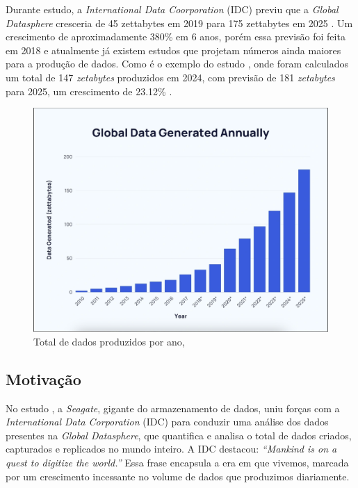 \documentclass[a4paper, 12pt]{article}
\newcommand{\citeb}[1]{\bibleftbracket\cite{#1}\bibrightbracket}
\begin{document}
    Durante estudo, a \textit{International Data Coorporation} (IDC) previu que a \textit{Global Datasphere} cresceria de 45 zettabytes em 2019 para 175 zettabytes em 2025 \citeb{digitization}. Um crescimento de aproximadamente 380\% em 6 anos, porém essa previsão foi feita em 2018 e atualmente já existem estudos que projetam números ainda maiores para a produção de dados. Como é o exemplo do estudo , onde foram calculados um total de 147 \textit{zetabytes} produzidos em 2024, com previsão de 181 \textit{zetabytes} para 2025, um crescimento de 23.12\% \citeb{data_created}.

    \begin{figure}[h]
        \includegraphics[width=\textwidth,height=0.9\textheight,keepaspectratio]{global-data-generated-annually-fabio-duarte.png}
        \centering
        \caption{Total de dados produzidos por ano, \citeb{data_created}}
        \centering
        \label{fig:total_dados_anual}
    \end{figure}        

    \subsection{Motivação}

    No estudo , a \textit{Seagate}, gigante do armazenamento de dados, uniu forças com a \textit{International Data Corporation} (IDC) para conduzir uma análise dos dados presentes na \textit{Global Datasphere}, que quantifica e analisa o total de dados criados, capturados e replicados no mundo inteiro. A IDC destacou: \textit{“Mankind is on a quest to digitize the world.”} Essa frase encapsula a era em que vivemos, marcada por um crescimento incessante no volume de dados que produzimos diariamente.
    
\end{document}
